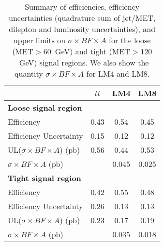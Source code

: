 \begin{table}[hbt]
\begin{center}
\caption{\label{tab:models} Summary of efficiencies, efficiency uncertainties (quadrature sum
of jet/MET, dilepton and luminosity uncertainties), and upper limits on $\sigma \times BF \times A$ 
for the loose (MET$>60$~GeV) and tight (MET$>120$~GeV) signal regions. We also show the quantity
$\sigma \times BF \times A$ for LM4 and LM8.}
\begin{tabular}{l|ccc}

\hline
                                         & $t\bar{t}$    & LM4     & LM8       \\
\hline
{\bf Loose signal region}                &               &         &           \\
Efficiency                               &       0.43    & 0.54    & 0.45      \\
Efficiency Uncertainty                   &       0.15    & 0.12    & 0.12      \\
UL($\sigma \times BF \times A$) (pb)     &       0.56    & 0.44    & 0.53      \\
$\sigma \times BF \times A$ (pb)         &               & 0.045   & 0.025     \\

\hline
{\bf Tight signal region}                &               &         &           \\
Efficiency                               &       0.42    &  0.55   & 0.48      \\
Efficiency Uncertainty                   &       0.26    &  0.13   & 0.13      \\
UL($\sigma \times BF \times A$) (pb)     &       0.23    &  0.17   & 0.19      \\
$\sigma \times BF \times A$ (pb)         &               &  0.035  & 0.018     \\
 
\hline

\end{tabular}
\end{center}
\end{table}








